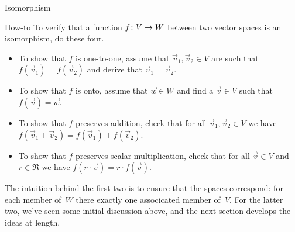 \documentclass[10pt,t]{beamer}
\begin{document}
\begin{frame}{Isomorphism}
\end{frame}


\begin{frame}{How-to}
To verify that a function $\mbox{$f\colon V\to W$}$
between two vector spaces is an isomorphism,
do these four.
\begin{itemize}
  \item To show that $f$ is one-to-one, 
    assume that $\vec{v}_1,\vec{v}_2\in V$ are such that
    $f(\vec{v}_1)=f(\vec{v}_2)$
    and derive that $\vec{v}_1=\vec{v}_2$.
  \item To show that $f$ is onto,
    assume that $\vec{w}\in W$ and find a $\vec{v}\in V$
    such that $f(\vec{v})=\vec{w}$.
  \item To show that $f$ preserves addition, check that for all 
    $\vec{v}_1,\vec{v}_2\in V$
    we have $f(\vec{v}_1+\vec{v}_2)=f(\vec{v}_1)+f(\vec{v}_2)$.
  \item To show that $f$ preserves scalar multiplication, check that for all 
    $\vec{v}\in V$ and $r\in\Re$
    we have $f(r\cdot\vec{v})=r\cdot f(\vec{v})$.
\end{itemize}
The intuition behind the first two is to ensure that
the spaces correspond: 
for each member of~$W$ there exactly one associcated member of~$V$.
For the latter two, we've seen some initial discussion above, and
the next section develops the ideas at length.
\end{frame}
\end{document}
